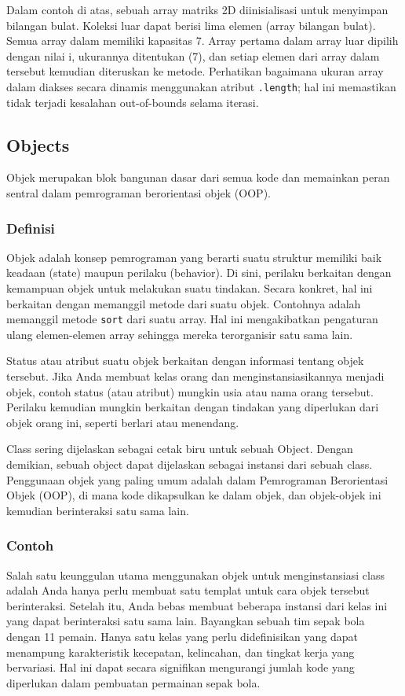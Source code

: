 \documentclass{article}
\begin{document}
Dalam contoh di atas, sebuah array matriks 2D diinisialisasi untuk menyimpan bilangan bulat. Koleksi luar dapat berisi lima elemen (array bilangan bulat). Semua array dalam memiliki kapasitas 7. Array pertama dalam array luar dipilih dengan nilai i, ukurannya ditentukan (7), dan setiap elemen dari array dalam tersebut kemudian diteruskan ke metode. Perhatikan bagaimana ukuran array dalam diakses secara dinamis menggunakan atribut \verb|.length|; hal ini memastikan tidak terjadi kesalahan out-of-bounds selama iterasi.

\subsection{Objects}
Objek merupakan blok bangunan dasar dari semua kode dan memainkan peran sentral dalam pemrograman berorientasi objek (OOP).

\subsubsection{Definisi}
Objek adalah konsep pemrograman yang berarti suatu struktur memiliki baik keadaan (state) maupun perilaku (behavior). Di sini, perilaku berkaitan dengan kemampuan objek untuk melakukan suatu tindakan. Secara konkret, hal ini berkaitan dengan memanggil metode dari suatu objek. Contohnya adalah memanggil metode \verb|sort| dari suatu array. Hal ini mengakibatkan pengaturan ulang elemen-elemen array sehingga mereka terorganisir satu sama lain.

Status atau atribut suatu objek berkaitan dengan informasi tentang objek tersebut. Jika Anda membuat kelas orang dan menginstansiasikannya menjadi objek, contoh status (atau atribut) mungkin usia atau nama orang tersebut. Perilaku kemudian mungkin berkaitan dengan tindakan yang diperlukan dari objek orang ini, seperti berlari atau menendang.

Class sering dijelaskan sebagai cetak biru untuk sebuah Object. Dengan demikian, sebuah object dapat dijelaskan sebagai instansi dari sebuah class. Penggunaan objek yang paling umum adalah dalam Pemrograman Berorientasi Objek (OOP), di mana kode dikapsulkan ke dalam objek, dan objek-objek ini kemudian berinteraksi satu sama lain.

\subsubsection{Contoh}
Salah satu keunggulan utama menggunakan objek untuk menginstansiasi class adalah Anda hanya perlu membuat satu templat untuk cara objek tersebut berinteraksi. Setelah itu, Anda bebas membuat beberapa instansi dari kelas ini yang dapat berinteraksi satu sama lain. Bayangkan sebuah tim sepak bola dengan 11 pemain. Hanya satu kelas yang perlu didefinisikan yang dapat menampung karakteristik kecepatan, kelincahan, dan tingkat kerja yang bervariasi. Hal ini dapat secara signifikan mengurangi jumlah kode yang diperlukan dalam pembuatan permainan sepak bola.
\end{document}
